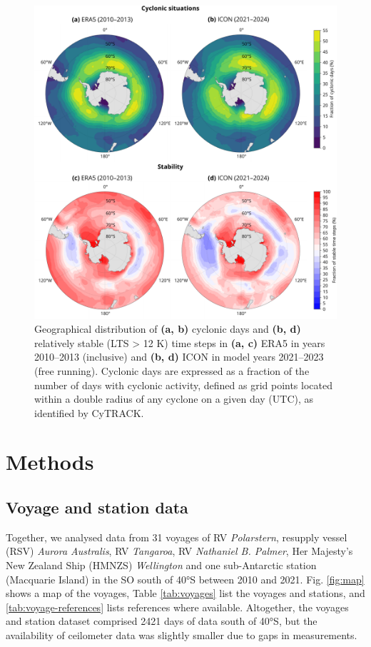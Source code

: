 \documentclass[12pt,a4paper]{article}
\begin{document}
\begin{figure}
\centering
\includegraphics[width=\textwidth]{img/cyc_stab_dist.pdf}
\caption{
Geographical distribution of \textbf{(a, b)} cyclonic days and \textbf{(b, d)}
relatively stable (LTS > 12 K) time steps in \textbf{(a, c)} ERA5 in years
2010--2013 (inclusive) and \textbf{(b, d)} ICON in model years 2021--2023 (free
running). Cyclonic days are expressed as a fraction of the number of days with
cyclonic activity, defined as grid points located within a double radius of any
cyclone on a given day (UTC), as identified by CyTRACK.
}
\label{fig:lts}
\end{figure}

\section{Methods}
\label{sec:methods}

\subsection{Voyage and station data}

Together, we analysed data from 31 voyages of RV \emph{Polarstern}, resupply
vessel (RSV) \emph{Aurora Australis}, RV \emph{Tangaroa}, RV \emph{Nathaniel B.
Palmer}, Her Majesty's New Zealand Ship (HMNZS) \emph{Wellington} and one
sub-Antarctic station (Macquarie Island) in the SO south of 40°S between 2010
and 2021. Fig. \ref{fig:map} shows a map of the voyages, Table \ref{tab:voyages}
list the voyages and stations, and \ref{tab:voyage-references} lists references
where available. Altogether, the voyages and station dataset comprised
2421 days of data south of 40°S, but the availability of ceilometer data was
slightly smaller due to gaps in measurements.
\end{document}
